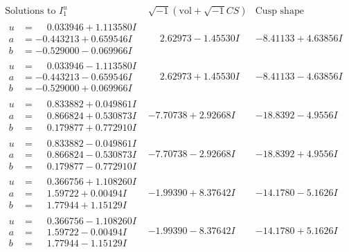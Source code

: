 \documentclass[1p]{elsarticle_modified}
\theoremstyle{definition}
\newcommand{\I}{\sqrt{-1}}
\begin{document}
$$\begin{array}{c|c|c}  
\text{Solutions to }I^u_{1}& \I (\text{vol} + \sqrt{-1}CS) & \text{Cusp shape}\\
 \hline 
\begin{aligned}
u &= \phantom{-}0.033946 + 1.113580 I \\
a &= -0.443213 + 0.659546 I \\
b &= -0.529000 - 0.069966 I\end{aligned}
 & \phantom{-}2.62973 - 1.45530 I & -8.41133 + 4.63856 I \\ \hline\begin{aligned}
u &= \phantom{-}0.033946 - 1.113580 I \\
a &= -0.443213 - 0.659546 I \\
b &= -0.529000 + 0.069966 I\end{aligned}
 & \phantom{-}2.62973 + 1.45530 I & -8.41133 - 4.63856 I \\ \hline\begin{aligned}
u &= \phantom{-}0.833882 + 0.049861 I \\
a &= \phantom{-}0.866824 + 0.530873 I \\
b &= \phantom{-}0.179877 + 0.772910 I\end{aligned}
 & -7.70738 + 2.92668 I & -18.8392 - 4.9556 I \\ \hline\begin{aligned}
u &= \phantom{-}0.833882 - 0.049861 I \\
a &= \phantom{-}0.866824 - 0.530873 I \\
b &= \phantom{-}0.179877 - 0.772910 I\end{aligned}
 & -7.70738 - 2.92668 I & -18.8392 + 4.9556 I \\ \hline\begin{aligned}
u &= \phantom{-}0.366756 + 1.108260 I \\
a &= \phantom{-}1.59722 + 0.00494 I \\
b &= \phantom{-}1.77944 + 1.15129 I\end{aligned}
 & -1.99390 + 8.37642 I & -14.1780 - 5.1626 I \\ \hline\begin{aligned}
u &= \phantom{-}0.366756 - 1.108260 I \\
a &= \phantom{-}1.59722 - 0.00494 I \\
b &= \phantom{-}1.77944 - 1.15129 I\end{aligned}
 & -1.99390 - 8.37642 I & -14.1780 + 5.1626 I \\ \hline\begin{aligned}

\end{aligned}
\end{array}$$
\end{document}
